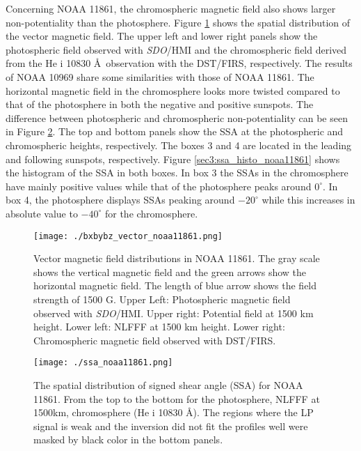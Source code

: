 \documentclass[manuscript]{aastex61}
\begin{document}
Concerning NOAA 11861, the chromospheric magnetic field also shows larger non-potentiality than the photosphere.
Figure \ref{sec3:bxbybz_noaa11861} shows the spatial distribution of the vector magnetic field. 
The upper left and lower right panels show the photospheric field observed with {\it SDO}/HMI and the chromospheric field derived from the He {\sc i} 10830 \AA \ observation with the DST/FIRS, respectively.
The results of NOAA 10969 share some similarities with those of NOAA 11861. 
The horizontal magnetic field in the chromosphere looks more twisted compared to that of the photosphere in both the negative and positive sunspots. 
The difference between photospheric and chromospheric non-potentiality can be seen in Figure \ref{sec3:ssa_noaa11861}. 
The top and bottom panels show the SSA at the photospheric and chromospheric heights, respectively. 
The boxes 3 and 4 are located in the leading and following sunspots, respectively.
Figure \ref{sec3:ssa_histo_noaa11861} shows the histogram of the SSA in both boxes. 
In box 3 the SSAs in the chromosphere have mainly positive values while that of the photosphere peaks
around $0^\circ$. In box 4, the photosphere displays SSAs peaking around $-20^\circ$
while this increases in absolute value to $-40^\circ$ for the chromosphere. 


\begin{figure}
\texttt{[image: ./bxbybz\_vector\_noaa11861.png]}
\caption{Vector magnetic field distributions in NOAA 11861. The gray scale shows the vertical magnetic field and the green arrows show the horizontal magnetic field. The length of blue arrow shows the field strength of 1500 G. Upper Left: Photospheric magnetic field observed with {\it SDO}/HMI. Upper right: Potential field at 1500 km height. Lower left: NLFFF at 1500 km height. Lower right: Chromospheric magnetic field observed with DST/FIRS.}
\label{sec3:bxbybz_noaa11861}
\end{figure}

\begin{figure}
\begin{center}
\texttt{[image: ./ssa\_noaa11861.png]}
\end{center}
\caption{The spatial distribution of signed shear angle (SSA) for NOAA 11861. From the top to the bottom for the photosphere, NLFFF at 1500km, chromosphere (He {\sc i} 10830 \AA). The regions where the LP signal is weak and the inversion did not fit the profiles well were masked by black color in the bottom panels. }
\label{sec3:ssa_noaa11861}
\end{figure}
\end{document}
